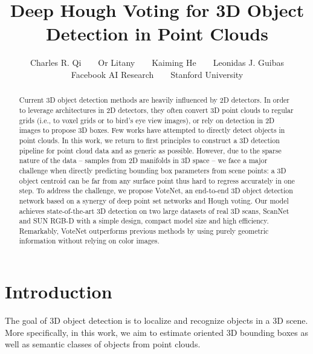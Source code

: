 \documentclass[10pt,twocolumn,letterpaper]{article}
\newcommand\votenet{VoteNet}
\begin{document}
\title{Deep Hough Voting for 3D Object Detection in Point Clouds}

\author{Charles R. Qi~~~~Or Litany~~~~Kaiming He~~~~Leonidas J. Guibas \vspace{0.2cm}\\
Facebook AI Research~~~~Stanford University
}


\maketitle


\begin{abstract}
   








Current 3D object detection methods are heavily influenced by 2D detectors. In order to leverage architectures in 2D detectors, they often convert 3D point clouds to regular grids (i.e., to voxel grids or to bird's eye view images), or rely on detection in 2D images to propose 3D boxes. Few works have attempted to directly detect objects in point clouds.
In this work, we return to first principles to construct a 3D detection pipeline for point cloud data and as generic as possible.
However, due to the sparse nature of the data -- samples from 2D manifolds in 3D space -- we face a major challenge when directly predicting bounding box parameters from scene points: a 3D object centroid can be far from any surface point thus hard to regress accurately in one step.
To address the challenge, we propose \votenet{}, an end-to-end 3D object detection network based on a synergy of deep point set networks and Hough voting.
Our model achieves state-of-the-art 3D detection on two large datasets of real 3D scans, ScanNet and SUN RGB-D with a simple design, compact model size and high efficiency. Remarkably, \votenet{} outperforms previous methods by using purely geometric information without relying on color images.   \end{abstract}

\section{Introduction}




The goal of 3D object detection is to localize and recognize objects in a 3D scene. More specifically, in this work, we aim to estimate oriented 3D bounding boxes as well as semantic classes of objects from point clouds.
\end{document}
